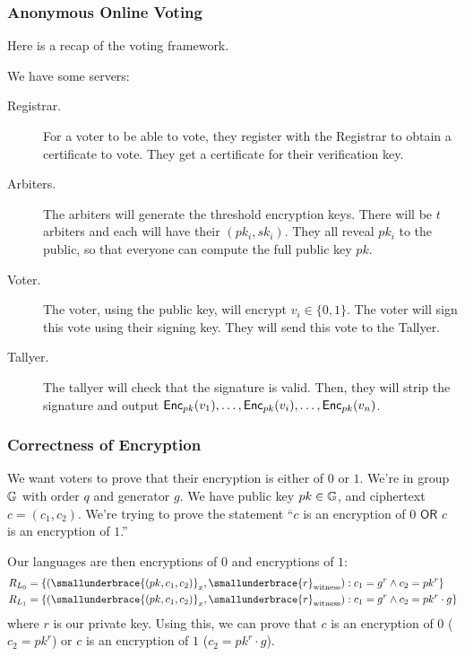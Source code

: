 \subsubsection{Anonymous Online Voting}

Here is a recap of the voting framework.

We have some servers:
\begin{description}
    \item[Registrar.] For a voter to be able to vote, they register with the Registrar to obtain a certificate to vote. They get a certificate for their verification key.
    \item[Arbiters.] The arbiters will generate the threshold encryption keys. There will be $t$ arbiters and each will have their $(pk_i, sk_i)$. They all reveal $pk_i$ to the public, so that everyone can compute the full public key $pk$.
    \item[Voter.] The voter, using the public key, will encrypt $v_i \in\{0, 1\}$. The voter will sign this vote using their signing key. They will send this vote to the Tallyer.
    \item[Tallyer.] The tallyer will check that the signature is valid. Then, they will strip the signature and output $\operatorname{\mathsf{Enc}}_{pk}(v_1), \dots, \operatorname{\mathsf{Enc}}_{pk}(v_i), \dots, \operatorname{\mathsf{Enc}}_{pk}(v_n)$.
\end{description}

\subsubsection{Correctness of Encryption}
We want voters to prove that their encryption is either of $0$ or $1$. We're in group $\mathbb G$ with order $q$ and generator $g$. We have public key $pk\in \mathbb G$, and ciphertext $c = (c_1, c_2)$. We're trying to prove the statement ``$c$ is an encryption of $0$ $\mathsf{OR}$ $c$ is an encryption of $1$.''

Our languages are then encryptions of $0$ and encryptions of $1$:
\begin{align*}
    R_{L_0} & = \{(\smallunderbrace{(pk, c_1, c_2)}_{x}, \smallunderbrace{r}_{\text{witness}}) : c_1 = g^r\land c_2 = pk^r\}        \\
    R_{L_1} & = \{(\smallunderbrace{(pk, c_1, c_2)}_{x}, \smallunderbrace{r}_{\text{witness}}) : c_1 = g^r\land c_2 = pk^r\cdot g\}
\end{align*}
where $r$ is our private key. Using this, we can prove that $c$ is an encryption of $0$ ($c_2 = pk^r$) or $c$ is an encryption of $1$ ($c_2 = pk^r\cdot g$).

